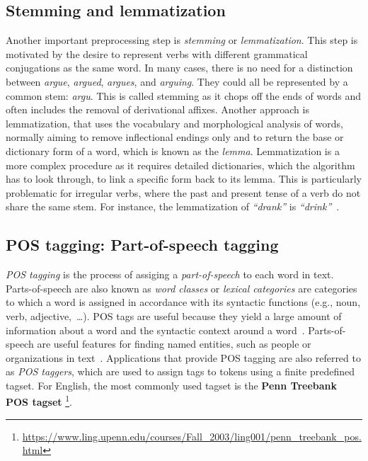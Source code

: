 \subsection{Stemming and  lemmatization}\label{subsec:steming}
Another important preprocessing step is \emph{stemming} or \emph{lemmatization}. This step is motivated by the desire to represent verbs with different grammatical conjugations as the same word.
In many cases, there is no need for a distinction between \emph{argue}, \emph{argued}, \emph{argues}, and \emph{arguing}. They could all be represented by a common stem: \emph{argu}. This is called stemming as it chops off the ends of words and often includes the removal of derivational affixes. Another approach is lemmatization, that uses the vocabulary and morphological analysis of words, normally aiming to remove inflectional endings only and to return the base or dictionary form of a word, which is known as the \emph{lemma}. Lemmatization is a more complex procedure as it requires detailed dictionaries, which the algorithm has to look through, to link a specific form back to its lemma. This is particularly problematic for irregular verbs, where the past and present tense of a verb do not share the same stem. For instance,
the lemmatization of \emph{``drank''} is \emph{``drink''}~.
\subsection{POS tagging: Part-of-speech tagging}\label{subsec:pos}
\emph{POS tagging} is the process of assiging a\emph{ part-of-speech} to each word in text. Parts-of-speech are also known as \emph{word classes} or \emph{lexical categories} are categories to which a word is assigned in accordance with its syntactic functions (e.g., noun, verb, adjective,~\dots). POS tags are useful because they yield a large amount of information about a word and the syntactic context around a word~. Parts-of-speech are useful features for finding named entities, such as people or organizations in text~. Applications that provide POS tagging are also referred to as \emph{POS taggers}, which are used to assign tags to tokens using a finite predefined tagset. For English, the most commonly used tagset is the \textbf{Penn Treebank POS tagset} \footnote{\url{https://www.ling.upenn.edu/courses/Fall_2003/ling001/penn_treebank_pos.html}}. 
